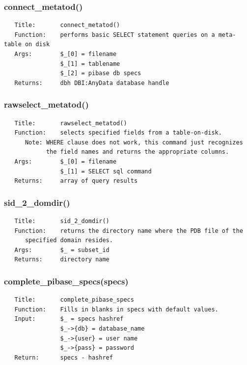 \documentclass{article}
\begin{document}
\subsubsection*{connect\_metatod()\label{pibase_pm_connect_metatod_}}
\begin{verbatim}
   Title:       connect_metatod()
   Function:    performs basic SELECT statement queries on a meta-table on disk
   Args:        $_[0] = filename
                $_[1] = tablename
                $_[2] = pibase db specs
   Returns:     dbh DBI:AnyData database handle
\end{verbatim}
\subsubsection*{rawselect\_metatod()\label{pibase_pm_rawselect_metatod_}}
\begin{verbatim}
   Title:       rawselect_metatod()
   Function:    selects specified fields from a table-on-disk.
      Note: WHERE clause does not work, this command just recognizes
            the field names and returns the appropriate columns.
   Args:        $_[0] = filename
                $_[1] = SELECT sql command
   Returns:     array of query results
\end{verbatim}
\subsubsection*{sid\_2\_domdir()\label{pibase_pm_sid_2_domdir_}}
\begin{verbatim}
   Title:       sid_2_domdir()
   Function:    returns the directory name where the PDB file of the
      specified domain resides.
   Args:        $_ = subset_id
   Returns:     directory name
\end{verbatim}
\subsubsection*{complete\_pibase\_specs(specs)\label{pibase_pm_complete_pibase_specs_specs_}}
\begin{verbatim}
   Title:       complete_pibase_specs
   Function:    Fills in blanks in specs with default values.
   Input:       $_ = specs hashref
                $_->{db} = database_name
                $_->{user} = user name
                $_->{pass} = password
   Return:      specs - hashref
\end{verbatim}
\end{document}

